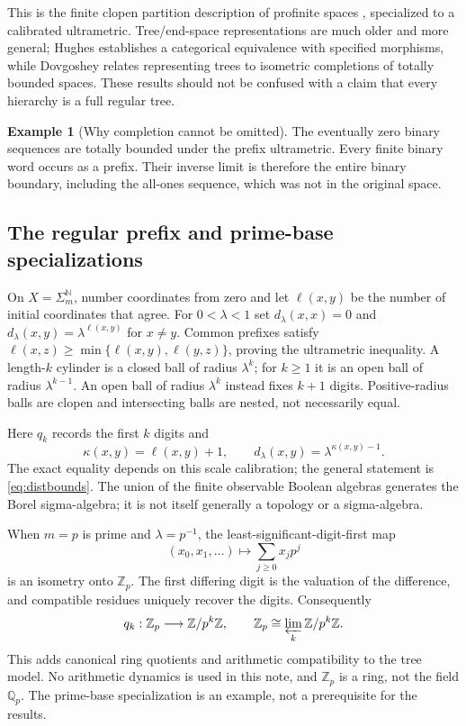 \documentclass[11pt]{article}
\theoremstyle{definition}
\newtheorem{example}[theorem]{Example}
\theoremstyle{remark}
\newcommand{\N}{\mathbb N}
\newcommand{\Z}{\mathbb Z}
\begin{document}
This is the finite clopen partition description of profinite spaces \cite[Lemma 5.22.2]{Stacks}, specialized to a calibrated ultrametric. Tree/end-space representations are much older and more general; Hughes \cite{Hughes2004} establishes a categorical equivalence with specified morphisms, while Dovgoshey \cite[Theorem 10.25]{Dovgoshey2025} relates representing trees to isometric completions of totally bounded spaces. These results should not be confused with a claim that every hierarchy is a full regular tree.

\begin{example}[Why completion cannot be omitted]
The eventually zero binary sequences are totally bounded under the prefix ultrametric. Every finite binary word occurs as a prefix. Their inverse limit is therefore the entire binary boundary, including the all-ones sequence, which was not in the original space.
\end{example}

\subsection{The regular prefix and prime-base specializations}
On $X=\Sigma_m^{\N}$, number coordinates from zero and let $\ell(x,y)$ be the number of initial coordinates that agree. For $0<\lambda<1$ set $d_\lambda(x,x)=0$ and $d_\lambda(x,y)=\lambda^{\ell(x,y)}$ for $x\ne y$. Common prefixes satisfy
$\ell(x,z)\geq\min\{\ell(x,y),\ell(y,z)\}$, proving the ultrametric inequality.
A length-$k$ cylinder is a closed ball of radius $\lambda^k$; for $k\geq1$ it is an open ball of radius $\lambda^{k-1}$. An open ball of radius $\lambda^k$ instead fixes $k+1$ digits. Positive-radius balls are clopen and intersecting balls are nested, not necessarily equal.

Here $q_k$ records the first $k$ digits and
\[
 \kappa(x,y)=\ell(x,y)+1,\qquad
 d_\lambda(x,y)=\lambda^{\kappa(x,y)-1}.
\]
The exact equality depends on this scale calibration; the general statement is \eqref{eq:distbounds}. The union of the finite observable Boolean algebras generates the Borel sigma-algebra; it is not itself generally a topology or a sigma-algebra.

When $m=p$ is prime and $\lambda=p^{-1}$, the least-significant-digit-first map
\[
 (x_0,x_1,\ldots)\longmapsto\sum_{j\geq0}x_jp^j
\]
is an isometry onto $\Z_p$. The first differing digit is the valuation of the difference, and compatible residues uniquely recover the digits. Consequently
\[
 q_k:\Z_p\longrightarrow\Z/p^k\Z,
 \qquad \Z_p\cong\varprojlim_k\Z/p^k\Z.
\]
This adds canonical ring quotients and arithmetic compatibility to the tree model. No arithmetic dynamics is used in this note, and $\Z_p$ is a ring, not the field $\mathbb Q_p$. The prime-base specialization is an example, not a prerequisite for the results.
\end{document}
